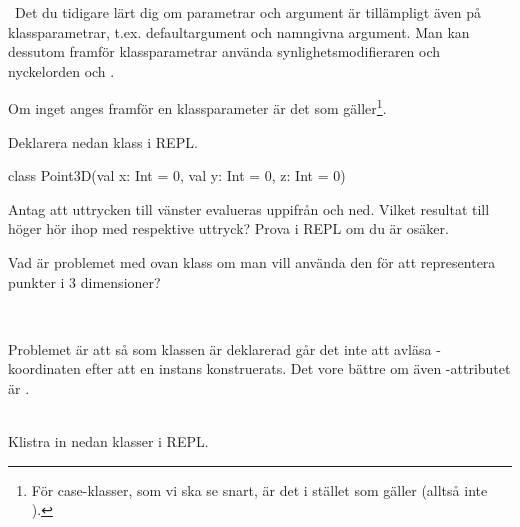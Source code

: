 
\QUESTBEGIN

\Task \what~Det du tidigare lärt dig om parametrar och argument är tillämpligt även på klassparametrar, t.ex. defaultargument och namngivna argument. Man kan dessutom framför klassparametrar använda synlighetsmodifieraren  och nyckelorden  och .

Om inget anges framför en klassparameter är det  som gäller\footnote{För case-klasser, som vi ska se snart, är det i stället  som gäller (alltså inte ).}.

Deklarera nedan klass i REPL.

\begin{Code}
class Point3D(val x: Int = 0, val y: Int = 0, z: Int = 0)
\end{Code}

\Subtask Antag att uttrycken till vänster evalueras uppifrån och ned. Vilket resultat till höger hör ihop med respektive uttryck? Prova i REPL om du är osäker.

\begin{ConceptConnections}

\end{ConceptConnections}

\Subtask Vad är problemet med ovan klass om man vill använda den för att representera punkter i 3 dimensioner?

\SOLUTION

\TaskSolved \what~

\SubtaskSolved

\begin{ConceptConnections}

\end{ConceptConnections}

\SubtaskSolved Problemet är att så som klassen  är deklarerad går det inte att avläsa -koordinaten efter att en instans konstruerats. Det vore bättre om även -attributet är .

\QUESTEND




\QUESTBEGIN

\Task \what~\\Klistra in nedan klasser i REPL.

